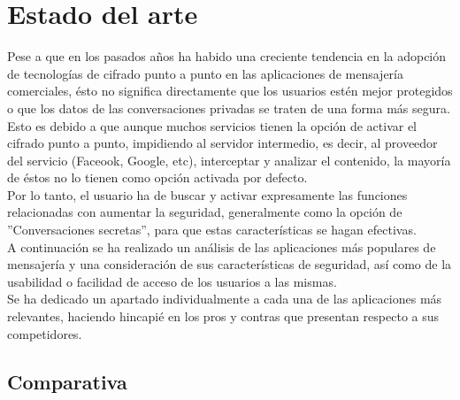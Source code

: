 \chapter{Estado del arte}

Pese a que en los pasados años ha habido una creciente tendencia en la adopción de tecnologías de cifrado punto a punto en las aplicaciones de mensajería comerciales, ésto no significa directamente que los usuarios estén mejor protegidos o que los datos de las conversaciones privadas se traten de una forma más segura. \\

Esto es debido a que aunque muchos servicios tienen la opción de activar el cifrado punto a punto, impidiendo al servidor intermedio, es decir, al proveedor del servicio (Faceook, Google, etc), interceptar y analizar el contenido, la mayoría de éstos no lo tienen como opción activada por defecto. \\

Por lo tanto, el usuario ha de buscar y activar expresamente las funciones relacionadas con aumentar la seguridad, generalmente como la opción de ''Conversaciones secretas'', para que estas características se hagan efectivas. \\

A continuación se ha realizado un análisis de las aplicaciones más populares de mensajería y una consideración de sus características de seguridad, así como de la usabilidad o facilidad de acceso de los usuarios a las mismas. \\

Se ha dedicado un apartado individualmente a cada una de las aplicaciones más relevantes, haciendo hincapié en los pros y contras que presentan respecto a sus competidores. \\

\pagebreak

\section {Comparativa}

